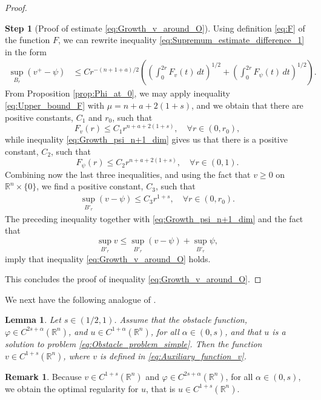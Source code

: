 \documentclass[11pt,reqno]{amsart}
\newtheorem{lem}[thm]{Lemma}
\theoremstyle{definition}
\newtheorem{rmk}[thm]{Remark}
\newtheorem{step}{Step}
\theoremstyle{remark}
\begin{document}
\begin{proof}
\begin{step}[Proof of estimate \eqref{eq:Growth_v_around_O}]
Using definition \eqref{eq:F} of the function $F$, we can rewrite inequality \eqref{eq:Supremum_estimate_difference_1} in the form
\begin{align*}
\sup_{B_r} (v^+-\psi)
&\leq C r^{-(n+1+a)/2} \left(\left(\int_0^{2r} F_v(t)\, dt\right)^{1/2} + \left(\int_0^{2r} F_{\psi}(t)\, dt\right)^{1/2} \right).
\end{align*}
From Proposition \ref{prop:Phi_at_0}, we may apply inequality \eqref{eq:Upper_bound_F} with $\mu=n+a+2(1+s)$, and we obtain that there are positive constants, $C_1$ and $r_0$, such that
$$
F_v(r) \leq C_1 r^{n+a+2(1+s)},\quad\forall r\in (0,r_0),
$$
while inequality \eqref{eq:Growth_psi_n+1_dim} gives us that there is a positive constant, $C_2$, such that
$$
F_{\psi}(r) \leq C_2 r^{n+a+2(1+s)},\quad\forall r\in (0,1).
$$
Combining now the last three inequalities, and using the fact that $v \geq 0$ on ${\mathbb{R}}^n\times\{0\}$, we find a positive constant, $C_3$, such that 
\begin{align*}
\sup_{B'_r} (v-\psi) \leq C_3 r^{1+s},\quad\forall r\in(0,r_0). 
\end{align*}
The preceding inequality together with \eqref{eq:Growth_psi_n+1_dim} and the fact that 
$$
\sup_{B'_r} v \leq \sup_{B'_r} (v-\psi) + \sup_{B'_r} \psi,
$$
imply that inequality \eqref{eq:Growth_v_around_O} holds.
\end{step}
This concludes the proof of inequality \eqref{eq:Growth_v_around_O}.
\end{proof}

We next have the following analogue of \cite[Corollary 6.8]{Caffarelli_Salsa_Silvestre_2008}.
\begin{lem}
\label{lem:Optimal_regularity}
Let $s\in (1/2,1)$. Assume that the obstacle function, $\varphi \in C^{2s+\alpha}({\mathbb{R}}^n)$, and $u\in C^{1+\alpha}({\mathbb{R}}^n)$, for all $\alpha\in (0,s)$, and that $u$ is a solution to problem \eqref{eq:Obstacle_problem_simple}. Then the function $v\in C^{1+s}({\mathbb{R}}^n)$, where $v$ is defined in \eqref{eq:Auxiliary_function_v}.
\end{lem}

\begin{rmk}
Because $v \in C^{1+s}({\mathbb{R}}^n)$ and $\varphi \in C^{2s+\alpha}({\mathbb{R}}^n)$, for all $\alpha\in (0,s)$, we obtain the optimal regularity for $u$, that is $u\in C^{1+s}({\mathbb{R}}^n)$.
\end{rmk}
\end{document}
